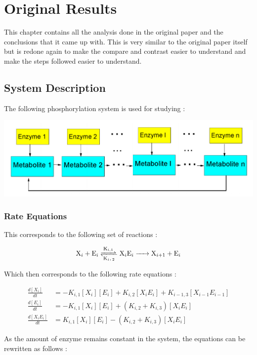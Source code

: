 \chapter*{Original Results}

This chapter contains all the analysis done 
in the original paper and the conclusions that 
it came up with. This is very similar to the original 
paper itself but is redone again to make the compare 
and contrast easier to understand and make the steps 
followed easier to understand.

\section*{System Description}
The following phosphorylation system is used for studying :

\begin{center}
    \includegraphics[scale=0.3]{img/orig-sys.png}
\end{center}

\subsection*{Rate Equations}
\noindent This corresponds to the following set of reactions :

$$ \ce{X_i + E_i <=>[K_{i,1}][K_i,2] X_iE_i -> X_{i+1} + E_i}$$

\noindent Which then corresponds to the following rate equations :

\begin{align*}
    \frac{d[X_i]}{dt} &= -K_{i,1}[X_i][E_i] + K_{i,2}[X_iE_i] + K_{i-1,3}[X_{i-1}E_{i-1}]\\
    \frac{d[E_i]}{dt} &= -K_{i,1}[X_i][E_i] + (K_{i,2} + K_{i,3})[X_iE_i]\\
    \frac{d[X_iE_i]}{dt} &= K_{i,1}[X_i][E_i] - (K_{i,2} + K_{i,3})[X_iE_i]
\end{align*}

\noindent As the amount of enzyme remains constant in the 
system, the equations can be rewritten as follows :

